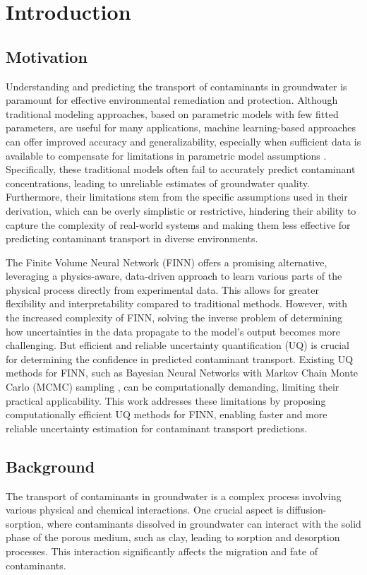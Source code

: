 \chapter{Introduction}

\section{Motivation}
Understanding and predicting the transport of contaminants in groundwater is paramount for effective environmental remediation and protection. Although traditional modeling approaches, based on parametric models with few fitted parameters, are useful for many applications, machine learning-based approaches can offer improved accuracy and generalizability, especially when sufficient data is available to compensate for limitations in parametric model assumptions \cite{finn}. Specifically, these traditional models often fail to accurately predict contaminant concentrations, leading to unreliable estimates of groundwater quality. Furthermore, their limitations stem from the specific assumptions used in their derivation, which can be overly simplistic or restrictive, hindering their ability to capture the complexity of real-world systems and making them less effective for predicting contaminant transport in diverse environments.

The Finite Volume Neural Network (FINN) \cite{finn} offers a promising alternative, leveraging a physics-aware, data-driven approach to learn various parts of the physical process directly from experimental data. This allows for greater flexibility and interpretability compared to traditional methods. However, with the increased complexity of FINN, solving the inverse problem of determining how uncertainties in the data propagate to the model's output becomes more challenging. But efficient and reliable uncertainty quantification (UQ) is crucial for determining the confidence in predicted contaminant transport. Existing UQ methods for FINN, such as Bayesian Neural Networks with Markov Chain Monte Carlo (MCMC) sampling \cite{bardenet2017markov}, can be computationally demanding, limiting their practical applicability. This work addresses these limitations by proposing computationally efficient UQ methods for FINN, enabling faster and more reliable uncertainty estimation for contaminant transport predictions.


\section{Background}
The transport of contaminants in groundwater is a complex process involving various physical and chemical interactions. One crucial aspect is diffusion-sorption, where contaminants dissolved in groundwater can interact with the solid phase of the porous medium, such as clay, leading to sorption and desorption processes. This interaction significantly affects the migration and fate of contaminants.

